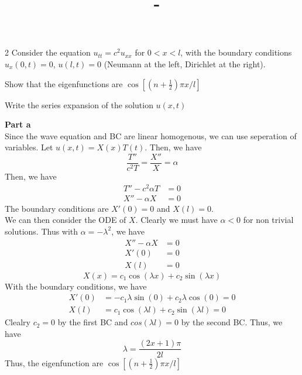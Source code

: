 \documentclass[answers,12pt,addpoints]{exam}
\author{\name}
\title{\course \ - \assignment}
\begin{document}
\maketitle


\newpage
\begin{questions}
     2
    Consider the equation \( u_{tt} = c^2 u_{xx} \) for \( 0 < x < l \), with the boundary conditions \( u_x(0,t) = 0 \), \( u(l, t) = 0 \) (Neumann at the left, Dirichlet at the right).
    \begin{parts}
        \item Show that the eigenfunctions are \( \cos[(n+\frac{1}{2})\pi x/l] \) 
        \item Write the series expansion of the solution \( u(x,t) \)
    \end{parts}
    \begin{solution}
        \textbf{Part a} \\
        Since the wave equation and BC are linear homogenous, we can use seperation of variables. Let \( u(x,t) = X(x)T(t) \). Then, we have
        \[ \frac{T''}{c^2T} = \frac{X''}{X} = \alpha \]
        Then, we have
        \begin{align*}
            T'' - c^2\alpha T &= 0 \\
            X'' - \alpha X &= 0
        \end{align*}
        The boundary conditions are \( X'(0) = 0 \) and \( X(l) = 0 \). \\
        We can then consider the ODE of \( X \). Clearly we must have $\alpha < 0 $ for non trivial solutions. Thus with $\alpha = -\lambda^2$, we have
        \begin{align*}
            X'' - \alpha X &= 0 \\
            X'(0) &= 0 \\
            X(l) &= 0
        \end{align*}
        \[ X(x) = c_1 \cos(\lambda x) + c_2 \sin(\lambda x) \] 
        With the boundary conditions, we have
        \begin{align*}
            X'(0) &= -c_1\lambda\sin(0) + c_2\lambda\cos(0) = 0 \\
            X(l) &= c_1\cos(\lambda l) + c_2\sin(\lambda l) = 0
        \end{align*}
        Clealry $c_2 = 0$ by the first BC and $cos(\lambda l) = 0$ by the second BC. Thus, we have
        \[ \lambda = \frac{(2x+1)\pi}{2l} \]
        Thus, the eigenfunction are \( \cos[(n+\frac{1}{2})\pi x/l] \)\\

\end{solution}
\end{questions}
\end{document}
